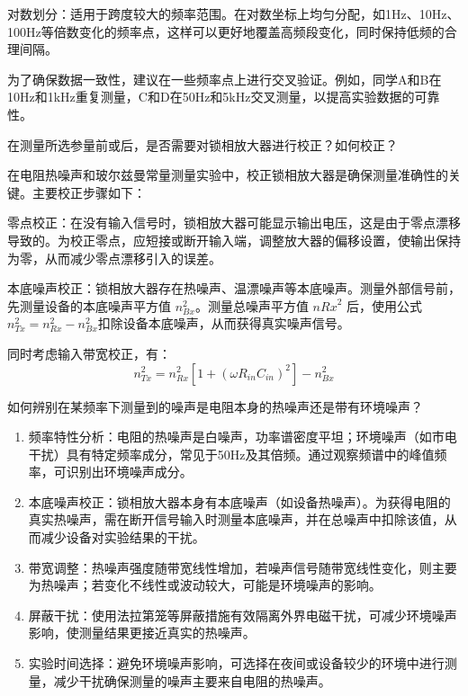 \documentclass[dvipsnames, svgnames,a4paper,11pt]{article}
\begin{document}
	对数划分：适用于跨度较大的频率范围。在对数坐标上均匀分配，如1Hz、10Hz、100Hz等倍数变化的频率点，这样可以更好地覆盖高频段变化，同时保持低频的合理间隔。

	为了确保数据一致性，建议在一些频率点上进行交叉验证。例如，同学A和B在10Hz和1kHz重复测量，C和D在50Hz和5kHz交叉测量，以提高实验数据的可靠性。





\begin{question}
	在测量所选参量前或后，是否需要对锁相放大器进行校正？如何校正？
\end{question}


	在电阻热噪声和玻尔兹曼常量测量实验中，校正锁相放大器是确保测量准确性的关键。主要校正步骤如下：

	零点校正：在没有输入信号时，锁相放大器可能显示输出电压，这是由于零点漂移导致的。为校正零点，应短接或断开输入端，调整放大器的偏移设置，使输出保持为零，从而减少零点漂移引入的误差。

	本底噪声校正：锁相放大器存在热噪声、温漂噪声等本底噪声。测量外部信号前，先测量设备的本底噪声平方值 $n_{Bx}^2$。测量总噪声平方值 $n{Rx}^2$ 后，使用公式 $n_{Tx}^2 = n_{Rx}^2 - n_{Bx}^2$扣除设备本底噪声，从而获得真实噪声信号。

	同时考虑输入带宽校正，有：
	\[
		n_{Tx}^2 = n_{Rx}^2[1 + (\omega R_{in} C_{in})^2] - n_{Bx}^2
	\]







\begin{question}
	如何辨别在某频率下测量到的噪声是电阻本身的热噪声还是带有环境噪声？
\end{question}

	\begin{enumerate}
		\item 频率特性分析：电阻的热噪声是白噪声，功率谱密度平坦；环境噪声（如市电干扰）具有特定频率成分，常见于50Hz及其倍频。通过观察频谱中的峰值频率，可识别出环境噪声成分。
		\item 本底噪声校正：锁相放大器本身有本底噪声（如设备热噪声）。为获得电阻的真实热噪声，需在断开信号输入时测量本底噪声，并在总噪声中扣除该值，从而减少设备对实验结果的干扰。
		\item 带宽调整：热噪声强度随带宽线性增加，若噪声信号随带宽线性变化，则主要为热噪声；若变化不线性或波动较大，可能是环境噪声的影响。
		\item 屏蔽干扰：使用法拉第笼等屏蔽措施有效隔离外界电磁干扰，可减少环境噪声影响，使测量结果更接近真实的热噪声。
		\item 实验时间选择：避免环境噪声影响，可选择在夜间或设备较少的环境中进行测量，减少干扰确保测量的噪声主要来自电阻的热噪声。
	\end{enumerate}
	
\end{document}

